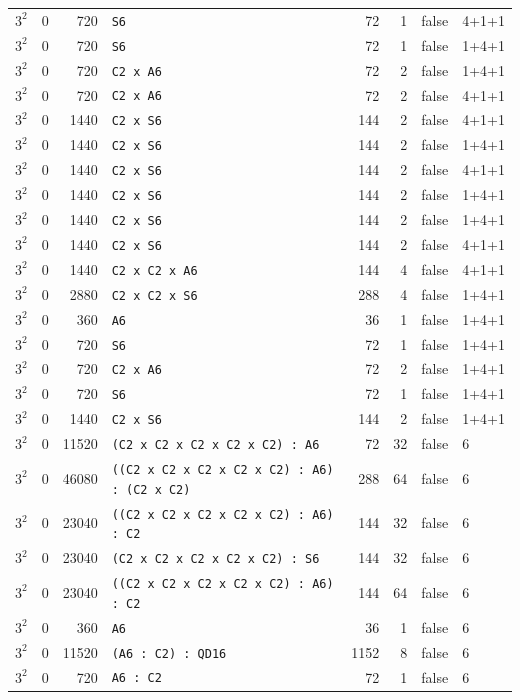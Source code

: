 \begin{longtable}{llrlrrll}
$3^2$ & 0 & 720 & \texttt{S6} & 72 & 1 & false & 4+1+1\\
$3^2$ & 0 & 720 & \texttt{S6} & 72 & 1 & false & 1+4+1\\
$3^2$ & 0 & 720 & \texttt{C2 x A6} & 72 & 2 & false & 1+4+1\\
$3^2$ & 0 & 720 & \texttt{C2 x A6} & 72 & 2 & false & 4+1+1\\
$3^2$ & 0 & 1440 & \texttt{C2 x S6} & 144 & 2 & false & 4+1+1\\
$3^2$ & 0 & 1440 & \texttt{C2 x S6} & 144 & 2 & false & 1+4+1\\
$3^2$ & 0 & 1440 & \texttt{C2 x S6} & 144 & 2 & false & 4+1+1\\
$3^2$ & 0 & 1440 & \texttt{C2 x S6} & 144 & 2 & false & 1+4+1\\
$3^2$ & 0 & 1440 & \texttt{C2 x S6} & 144 & 2 & false & 1+4+1\\
$3^2$ & 0 & 1440 & \texttt{C2 x S6} & 144 & 2 & false & 4+1+1\\
$3^2$ & 0 & 1440 & \texttt{C2 x C2 x A6} & 144 & 4 & false & 4+1+1\\
$3^2$ & 0 & 2880 & \texttt{C2 x C2 x S6} & 288 & 4 & false & 1+4+1\\
$3^2$ & 0 & 360 & \texttt{A6} & 36 & 1 & false & 1+4+1\\
$3^2$ & 0 & 720 & \texttt{S6} & 72 & 1 & false & 1+4+1\\
$3^2$ & 0 & 720 & \texttt{C2 x A6} & 72 & 2 & false & 1+4+1\\
$3^2$ & 0 & 720 & \texttt{S6} & 72 & 1 & false & 1+4+1\\
$3^2$ & 0 & 1440 & \texttt{C2 x S6} & 144 & 2 & false & 1+4+1\\
$3^2$ & 0 & 11520 & \texttt{(C2 x C2 x C2 x C2 x C2) : A6} & 72 & 32 & false & 6\\
$3^2$ & 0 & 46080 & \texttt{((C2 x C2 x C2 x C2 x C2) : A6) : (C2 x C2)} & 288 & 64 & false & 6\\
$3^2$ & 0 & 23040 & \texttt{((C2 x C2 x C2 x C2 x C2) : A6) : C2} & 144 & 32 & false & 6\\
$3^2$ & 0 & 23040 & \texttt{(C2 x C2 x C2 x C2 x C2) : S6} & 144 & 32 & false & 6\\
$3^2$ & 0 & 23040 & \texttt{((C2 x C2 x C2 x C2 x C2) : A6) : C2} & 144 & 64 & false & 6\\
$3^2$ & 0 & 360 & \texttt{A6} & 36 & 1 & false & 6\\
$3^2$ & 0 & 11520 & \texttt{(A6 : C2) : QD16} & 1152 & 8 & false & 6\\
$3^2$ & 0 & 720 & \texttt{A6 : C2} & 72 & 1 & false & 6\\

\end{longtable}
